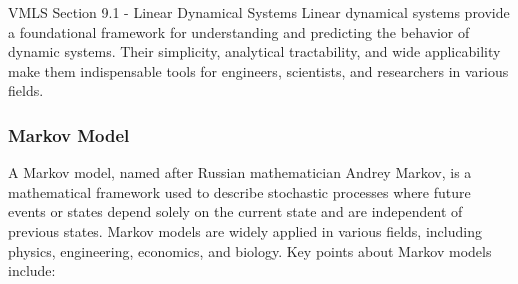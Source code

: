 \begin{notes}{VMLS Section 9.1 - Linear Dynamical Systems}
    Linear dynamical systems provide a foundational framework for understanding and predicting the behavior of dynamic systems. Their simplicity, analytical tractability, and wide applicability make them 
    indispensable tools for engineers, scientists, and researchers in various fields.

    \subsubsection*{Markov Model}

    A Markov model, named after Russian mathematician Andrey Markov, is a mathematical framework used to describe stochastic processes where future events or states depend solely on the current state 
    and are independent of previous states. Markov models are widely applied in various fields, including physics, engineering, economics, and biology. Key points about Markov models include:


\end{notes}
